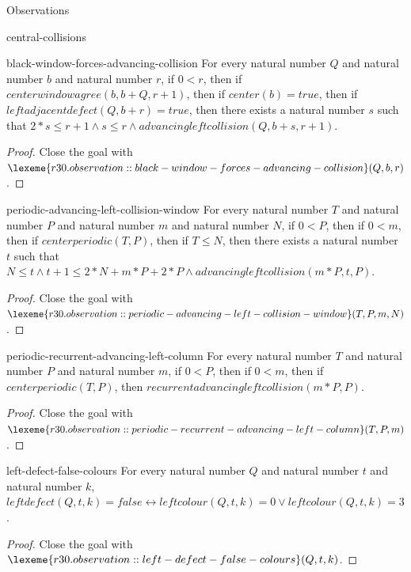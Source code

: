 \begin{lexlean}{Observations}
\begin{section}{central-collisions}
\begin{theorem}{black-window-forces-advancing-collision}
For every natural number \(Q\) and natural number \(b\) and natural number \(r\), if \(0 < r\), then if \(centerwindowagree(b, b + Q, r + 1)\), then if \(center(b) = true\), then if \(leftadjacentdefect(Q, b + r) = true\), then there exists a natural number \(s\) such that \(2 * s ≤ r + 1 ∧ s ≤ r ∧ advancingleftcollision(Q, b + s, r + 1)\).
\begin{proof}
Close the goal with \(\lexeme{r30.observation::black-window-forces-advancing-collision}(Q, b, r)\).
\end{proof}
\end{theorem}

\begin{theorem}{periodic-advancing-left-collision-window}
For every natural number \(T\) and natural number \(P\) and natural number \(m\) and natural number \(N\), if \(0 < P\), then if \(0 < m\), then if \(centerperiodic(T, P)\), then if \(T ≤ N\), then there exists a natural number \(t\) such that \(N ≤ t ∧ t + 1 ≤ 2 * N + m * P + 2 * P ∧ advancingleftcollision(m * P, t, P)\).
\begin{proof}
Close the goal with \(\lexeme{r30.observation::periodic-advancing-left-collision-window}(T, P, m, N)\).
\end{proof}
\end{theorem}

\begin{theorem}{periodic-recurrent-advancing-left-column}
For every natural number \(T\) and natural number \(P\) and natural number \(m\), if \(0 < P\), then if \(0 < m\), then if \(centerperiodic(T, P)\), then \(recurrentadvancingleftcollision(m * P, P)\).
\begin{proof}
Close the goal with \(\lexeme{r30.observation::periodic-recurrent-advancing-left-column}(T, P, m)\).
\end{proof}
\end{theorem}

\begin{theorem}{left-defect-false-colours}
For every natural number \(Q\) and natural number \(t\) and natural number \(k\), \(leftdefect(Q, t, k) = false ↔ leftcolour(Q, t, k) = 0 ∨ leftcolour(Q, t, k) = 3\).
\begin{proof}
Close the goal with \(\lexeme{r30.observation::left-defect-false-colours}(Q, t, k)\).
\end{proof}
\end{theorem}


\end{section}
\end{lexlean}
